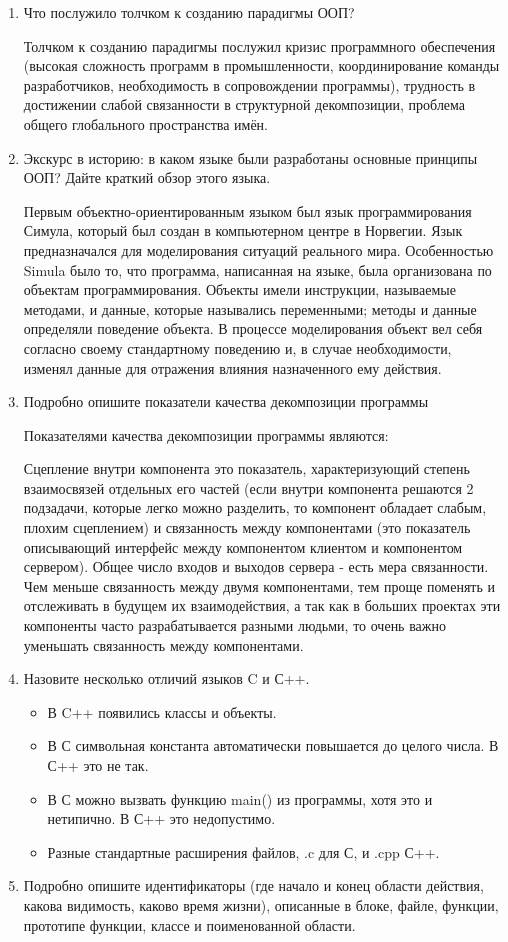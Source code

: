 \documentclass[14pt]{extarticle}
\begin{document}
\begin{enumerate}
	\item Что послужило толчком к созданию парадигмы ООП?

	      Толчком к созданию парадигмы послужил кризис программного обеспечения (высокая сложность программ в промышленности, координирование команды разработчиков, необходимость в сопровождении программы), трудность в достижении слабой связанности в структурной декомпозиции, проблема общего глобального пространства имён.

	\item Экскурс в историю: в каком языке были разработаны основные принципы ООП? Дайте краткий обзор этого языка.

	      Первым объектно-ориентированным языком был язык программирования Симула, который был создан в компьютерном центре в Норвегии. Язык предназначался для моделирования ситуаций реального мира. Особенностью Simula было то, что программа, написанная на языке, была организована по объектам программирования. Объекты имели инструкции, называемые методами, и данные, которые назывались переменными; методы и данные определяли поведение объекта. В процессе моделирования объект вел себя согласно своему стандартному поведению и, в случае необходимости, изменял данные для отражения влияния назначенного ему действия.

	\item Подробно опишите показатели качества декомпозиции программы

	      Показателями качества декомпозиции программы являются:

	      Сцепление внутри компонента это показатель, характеризующий степень взаимосвязей отдельных его частей (если внутри компонента решаются 2 подзадачи, которые легко можно разделить, то компонент обладает слабым, плохим сцеплением) и связанность между компонентами (это показатель описывающий интерфейс между компонентом клиентом и компонентом сервером). Общее число входов и выходов сервера - есть мера связанности. Чем меньше связанность между двумя компонентами, тем проще поменять и отслеживать в будущем их взаимодействия, а так как в больших проектах эти компоненты часто разрабатывается разными людьми, то очень важно уменьшать связанность между компонентами.

	\item Назовите несколько отличий языков C и С++.
	      \begin{itemize}
		      \item В C++ появились классы и объекты.
		      \item В С символьная константа автоматически повышается до целого числа. В С++ это не так.
		      \item В С можно вызвать функцию main() из программы, хотя это и нетипично. В С++ это недопустимо.
		      \item Разные стандартные расширения файлов, .c для С, и .cpp С++.
	      \end{itemize}
	\item Подробно опишите идентификаторы (где начало и конец области действия, какова видимость, каково время жизни), описанные в блоке, файле, функции, прототипе функции, классе и поименованной области.


\end{enumerate}
\end{document}
